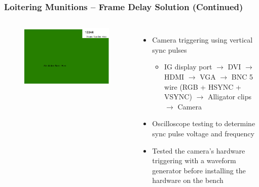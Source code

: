 \documentclass[aspectratio=169]{beamer}
\begin{document}
\begin{frame}
  \frametitle{Loitering Munitions -- Frame Delay Solution (Continued)}
  \begin{columns}[t]
    \begin{figure}
      \includegraphics[width=\textwidth]{DemoLMSFrame_Corrupt.png}
    \end{figure}
    
  \begin{itemize}
      \item Camera triggering using vertical sync pulses
      \begin{itemize}
      \item IG display port $\rightarrow$ DVI $\rightarrow$ HDMI
        $\rightarrow$ VGA $\rightarrow$ BNC 5 wire (RGB + HSYNC + VSYNC)
        $\rightarrow$ Alligator clips $\rightarrow$ Camera
      \end{itemize}
    \item Oscilloscope testing to determine sync pulse voltage and frequency
    \item Tested the camera's hardware triggering with a waveform generator
      before installing the hardware on the bench    
  \end{itemize}
  \end{columns}
\end{frame}


\end{document}
